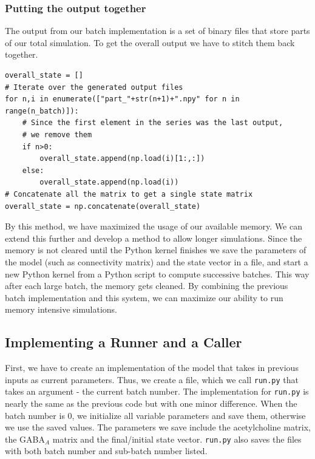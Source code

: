 \documentclass[10pt,letterpaper]{article}
\begin{document}
\begin{nolinenumbers}
\subsubsection*{Putting the output together}

The output from our batch implementation is a set of binary files that store parts of our total simulation. To get the overall output we have to stitch them back together.

\begin{verbatim}
overall_state = []
# Iterate over the generated output files
for n,i in enumerate(["part_"+str(n+1)+".npy" for n in range(n_batch)]):
    # Since the first element in the series was the last output, 
    # we remove them
    if n>0:
        overall_state.append(np.load(i)[1:,:])
    else:
        overall_state.append(np.load(i))
# Concatenate all the matrix to get a single state matrix
overall_state = np.concatenate(overall_state)
\end{verbatim}

By this method, we have maximized the usage of our available memory. We can extend this further and develop a method to allow longer simulations. Since the memory is not cleared until the Python kernel finishes we save the parameters of the model (such as connectivity matrix) and the state vector in a file, and start a new Python kernel from a Python script to compute successive batches. This way after each large batch, the memory gets cleaned. By combining the previous batch implementation and this system, we can maximize our ability to run memory intensive simulations.

\subsection*{Implementing a Runner and a Caller}

First, we have to create an implementation of the model that takes in previous inputs as current parameters. Thus, we create a file, which we call \texttt{run.py} that takes an argument - the current batch number. The implementation for \texttt{run.py} is nearly the same as the previous code but with one minor difference. When the batch number is 0, we initialize all variable parameters and save them, otherwise we use the saved values. The parameters we save include the acetylcholine matrix, the GABA$_{A}$ matrix and the final/initial state vector. \texttt{run.py} also saves the files with both batch number and sub-batch number listed. 


\end{nolinenumbers}
\end{document}
